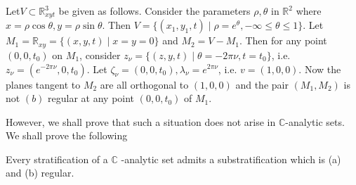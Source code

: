\begin{example}\label{chap1-exam5}  %
  Let\pageoriginale $ V \subset \mathbb{R}^{3}_{xyt}$ be given  as
  follows. Consider 
  the parameters $ \rho,\theta $ in $\mathbb{R}^2$ where $x=\rho \cos
  \theta, y= \rho \sin \theta$. Then $V= \{(x_1,y_1,t) \mid \rho
  =e^\theta, -\infty \leq \theta \leq1\}$. Let $M_1 = \mathbb{R}_{xy} =
  \{(x,y,t ) \mid x= y= 0 \}$ and $M_2 =V-M_1$.  Then for any point
  $(0,0,t_0)$ on $M_1$, consider $z_\nu = \{(z,y,t)\mid \theta = -2
  \pi \nu,t=t_0\}$,  i.e. $z_\nu = (e^{-2 \pi \nu}, 0,t_0)$. Let
  $\zeta_\nu = (0,0,t_0), \lambda_\nu = e^{2 \pi
    \nu}$, i.e. $v=(1,0,0)$. Now  the planes tangent to $M_2$ are all
  orthogonal to  $(1,0,0)$ and the  pair $(M_1,M_2)$ is not $(b)$
  regular at any point $(0,0,t_0)$ of $M_1$.  
\end{example}

However, we shall prove that such a situation does not arise in
$\mathbb{C}$-analytic sets. We shall prove the following  

\begin{theorem*}[(Whitney)] %
  Every stratification of a  $ \mathbb{C} $ -analytic set admits a
  substratification which is (a) and (b) regular. 
\end{theorem*}

